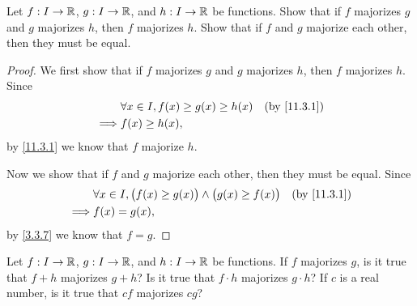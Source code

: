 \exercisesection

\begin{ex}\label{ex:11.3.1}
  Let \(f : I \to \mathbb{R}\), \(g : I \to \mathbb{R}\), and \(h : I \to \mathbb{R}\) be functions.
  Show that if \(f\) majorizes \(g\) and \(g\) majorizes \(h\), then \(f\) majorizes \(h\).
  Show that if \(f\) and \(g\) majorize each other, then they must be equal.
\end{ex}

\begin{proof}
  We first show that if \(f\) majorizes \(g\) and \(g\) majorizes \(h\), then \(f\) majorizes \(h\).
  Since
  \begin{align*}
             & \forall x \in I, f(x) \geq g(x) \geq h(x) & \text{(by \cref{11.3.1})} \\
    \implies & f(x) \geq h(x),
  \end{align*}
  by \cref{11.3.1} we know that \(f\) majorize \(h\).

  Now we show that if \(f\) and \(g\) majorize each other, then they must be equal.
  Since
  \begin{align*}
             & \forall x \in I, \big(f(x) \geq g(x)\big) \land \big(g(x) \geq f(x)\big) & \text{(by \cref{11.3.1})} \\
    \implies & f(x) = g(x),
  \end{align*}
  by \cref{3.3.7} we know that \(f = g\).
\end{proof}

\begin{ex}\label{ex:11.3.2}
  Let \(f : I \to \mathbb{R}\), \(g : I \to \mathbb{R}\), and \(h : I \to \mathbb{R}\) be functions.
  If \(f\) majorizes \(g\), is it true that \(f + h\) majorizes \(g + h\)?
  Is it true that \(f \cdot h\) majorizes \(g \cdot h\)?
  If \(c\) is a real number, is it true that \(cf\) majorizes \(cg\)?
\end{ex}

